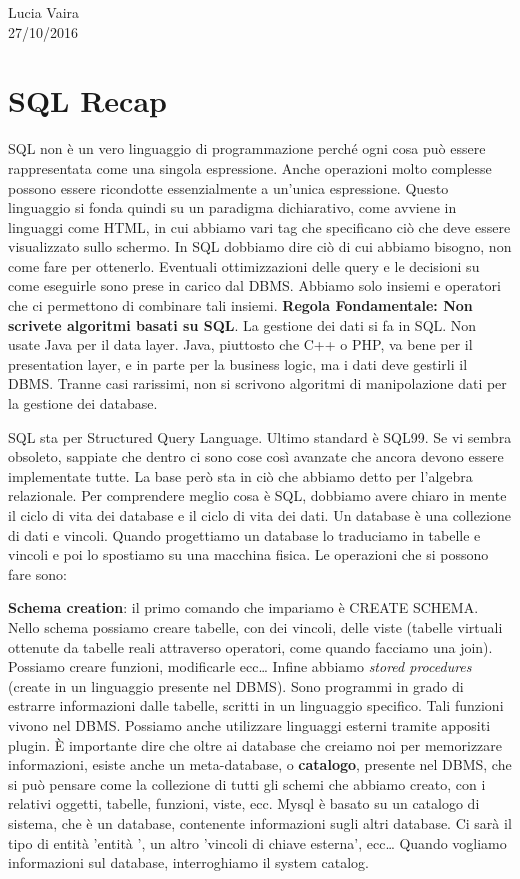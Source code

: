 \begin{flushright}Lucia Vaira\\27/10/2016\end{flushright}


\section{SQL Recap}

SQL non è un vero linguaggio di programmazione perché ogni cosa può essere rappresentata come una singola espressione. Anche operazioni molto complesse possono essere ricondotte essenzialmente a un’unica espressione. Questo linguaggio si fonda quindi su un paradigma dichiarativo,  come avviene in linguaggi come HTML, in cui abbiamo vari tag che specificano ciò che deve essere visualizzato sullo schermo. In SQL dobbiamo dire ciò di cui abbiamo bisogno, non come fare per ottenerlo. Eventuali ottimizzazioni delle query e le decisioni su come eseguirle sono prese in carico dal DBMS. Abbiamo solo insiemi e operatori che ci permettono di combinare tali insiemi. \textbf{Regola Fondamentale: Non scrivete algoritmi basati su SQL}. La gestione dei dati si fa in SQL.  Non usate Java per il data layer. Java, piuttosto che C++ o PHP, va bene per il presentation layer, e in parte per la business logic, ma i dati deve gestirli il DBMS. Tranne casi rarissimi, non si scrivono algoritmi di manipolazione dati per la gestione dei database.   

SQL sta per Structured Query Language. Ultimo standard è  SQL99. Se vi sembra obsoleto, sappiate che dentro ci sono cose così avanzate che ancora devono essere implementate tutte. La base però sta in ciò che abbiamo detto per l’algebra relazionale. Per comprendere meglio cosa è SQL,  dobbiamo avere chiaro in mente il ciclo di vita dei database e il ciclo di vita dei dati. Un database è una collezione di dati e vincoli. Quando progettiamo un database lo traduciamo in tabelle e vincoli e poi lo spostiamo su una macchina fisica.  Le operazioni che si possono fare sono:  

\textbf{Schema creation}: il primo comando che impariamo è CREATE SCHEMA. Nello schema possiamo creare tabelle, con dei vincoli, delle viste (tabelle virtuali ottenute da tabelle reali attraverso operatori, come quando facciamo una join). Possiamo creare funzioni, modificarle ecc… Infine abbiamo \textit{stored procedures} (create in un linguaggio presente nel DBMS). Sono programmi in grado di estrarre informazioni dalle tabelle, scritti in un linguaggio specifico. Tali funzioni vivono nel DBMS. Possiamo anche utilizzare linguaggi esterni tramite appositi plugin. È importante dire che oltre ai database che creiamo noi per memorizzare informazioni, esiste anche un meta-database, o \textbf{catalogo}, presente nel DBMS, che si può pensare come la collezione di tutti gli schemi che abbiamo creato, con i relativi oggetti, tabelle, funzioni, viste, ecc. Mysql è basato su un catalogo di sistema, che è un database, contenente informazioni sugli altri database. Ci sarà il tipo di entità  'entità ', un altro 'vincoli di chiave esterna', ecc… Quando vogliamo informazioni sul database,  interroghiamo il system catalog.  

